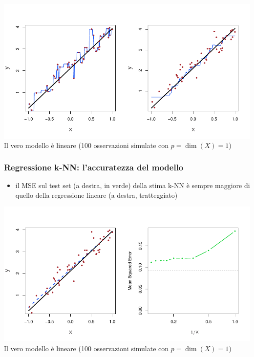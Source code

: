 {\begin{frame}
	\begin{center}
		\includegraphics[scale=0.55]{images/supervised/knn_regression/3_17.pdf}\\
		Il vero modello è lineare (100 osservazioni simulate con $p = \dim(X)=1$)
	\end{center}
\end{frame}


\begin{frame}

	\frametitle{Regressione k-NN: l'accuratezza del modello}

	\begin{itemize}
		\item il MSE sul test set (a destra, in verde) della stima k-NN è sempre maggiore di quello della regressione lineare (a destra, tratteggiato)
	\end{itemize}

	\begin{center}
		\includegraphics[scale=0.55]{images/supervised/knn_regression/3_18.pdf}\\
		Il vero modello è lineare (100 osservazioni simulate con $p = \dim(X)=1$)
	\end{center}
\end{frame}


}
